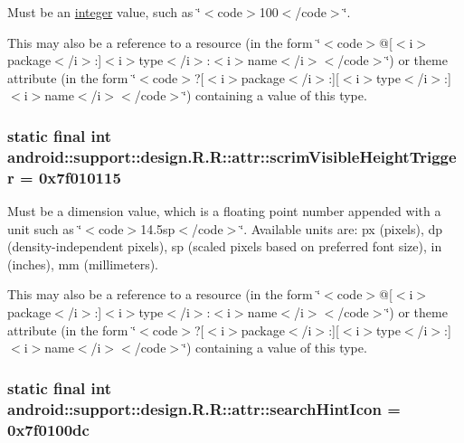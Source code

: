 Must be an \hyperlink{classandroid_1_1support_1_1design_1_1_r_1_1integer}{integer} value, such as \char`\"{}$<$code$>$100$<$/code$>$\char`\"{}. 

This may also be a reference to a resource (in the form \char`\"{}$<$code$>$@\mbox{[}$<$i$>$package$<$/i$>$:\mbox{]}$<$i$>$type$<$/i$>$:$<$i$>$name$<$/i$>$$<$/code$>$\char`\"{}) or theme attribute (in the form \char`\"{}$<$code$>$?\mbox{[}$<$i$>$package$<$/i$>$:\mbox{]}\mbox{[}$<$i$>$type$<$/i$>$:\mbox{]}$<$i$>$name$<$/i$>$$<$/code$>$\char`\"{}) containing a value of this type. \hypertarget{classandroid_1_1support_1_1design_1_1_r_1_1attr_c9a6c5cdc12fddb5c275fc614ab4d668}{
\subsubsection[{scrimVisibleHeightTrigger}]{\setlength{\rightskip}{0pt plus 5cm}static final int android::support::design.R.R::attr::scrimVisibleHeightTrigger = 0x7f010115}}
\label{classandroid_1_1support_1_1design_1_1_r_1_1attr_c9a6c5cdc12fddb5c275fc614ab4d668}


Must be a dimension value, which is a floating point number appended with a unit such as \char`\"{}$<$code$>$14.5sp$<$/code$>$\char`\"{}. Available units are: px (pixels), dp (density-independent pixels), sp (scaled pixels based on preferred font size), in (inches), mm (millimeters). 

This may also be a reference to a resource (in the form \char`\"{}$<$code$>$@\mbox{[}$<$i$>$package$<$/i$>$:\mbox{]}$<$i$>$type$<$/i$>$:$<$i$>$name$<$/i$>$$<$/code$>$\char`\"{}) or theme attribute (in the form \char`\"{}$<$code$>$?\mbox{[}$<$i$>$package$<$/i$>$:\mbox{]}\mbox{[}$<$i$>$type$<$/i$>$:\mbox{]}$<$i$>$name$<$/i$>$$<$/code$>$\char`\"{}) containing a value of this type. \hypertarget{classandroid_1_1support_1_1design_1_1_r_1_1attr_975e77ce70bab3987db2f257cad85103}{
\subsubsection[{searchHintIcon}]{\setlength{\rightskip}{0pt plus 5cm}static final int android::support::design.R.R::attr::searchHintIcon = 0x7f0100dc}}
\label{classandroid_1_1support_1_1design_1_1_r_1_1attr_975e77ce70bab3987db2f257cad85103}


